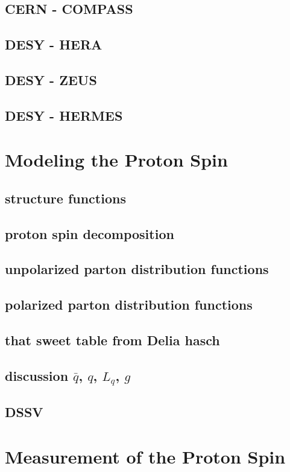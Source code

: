 \subsection{CERN - COMPASS}
\subsection{DESY - HERA}
\subsection{DESY - ZEUS}
\subsection{DESY - HERMES}

\clearpage
\section{Modeling the Proton Spin}
\subsection{ structure functions}
\subsection{ proton spin decomposition}
\subsection{ unpolarized parton distribution functions}
\subsection{ polarized parton distribution functions}
\subsection{ that sweet table from Delia hasch}
\subsection{ discussion $\bar{q}$, $q$, $L_q$, $g$}
\subsection{ DSSV }

\clearpage
\section{Measurement of the Proton Spin}
